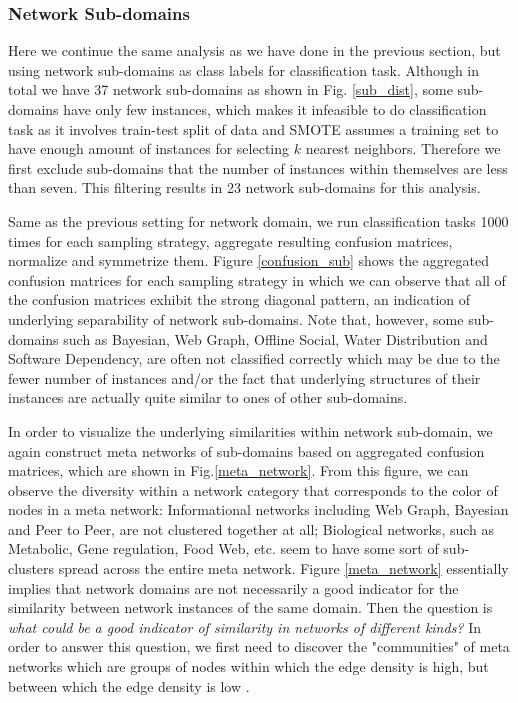 \documentclass{article}
\begin{document}
\subsubsection{Network Sub-domains}
Here we continue the same analysis as we have done in the previous section, but using network sub-domains as class labels for classification task.
Although in total we have 37 network sub-domains as shown in Fig. \ref{sub_dist}, some sub-domains have only few instances, which makes it infeasible to do classification task as it involves train-test split of data and SMOTE assumes a training set to have enough amount of instances for selecting $k$ nearest neighbors. Therefore we first exclude sub-domains that the number of instances within themselves are less than seven. This filtering results in 23 network sub-domains for this analysis. 

Same as the previous setting for network domain, we run classification tasks 1000 times for each sampling strategy, aggregate resulting confusion matrices, normalize and symmetrize them. Figure \ref{confusion_sub} shows the aggregated confusion matrices for each sampling strategy in which we can observe that all of the confusion matrices exhibit the strong diagonal pattern, an indication of underlying separability of network sub-domains. Note that, however, some sub-domains such as Bayesian, Web Graph, Offline Social, Water Distribution and Software Dependency, are often not classified correctly which may be due to the fewer number of instances and/or the fact that underlying structures of their instances are actually quite similar to ones of other sub-domains.

In order to visualize the underlying similarities within network sub-domain, we again construct meta networks of sub-domains based on aggregated confusion matrices, which are shown in Fig.\ref{meta_network}. From this figure, we can observe the diversity within a network category that corresponds to the color of nodes in a meta network: Informational networks including Web Graph, Bayesian and Peer to Peer, are not clustered together at all; Biological networks, such as Metabolic, Gene regulation, Food Web, etc. seem to have some sort of sub-clusters spread across the entire meta network. Figure \ref{meta_network} essentially implies that network domains are not necessarily a good indicator for the similarity between network instances of the same domain. Then the question is \textit{what could be a good indicator of similarity in networks of different kinds?} In order to answer this question, we first need to discover the "communities" of meta networks which are groups of nodes within which the edge density is high, but between which the edge density is low \cite{Modularity1,Modularity2}.
\end{document}
